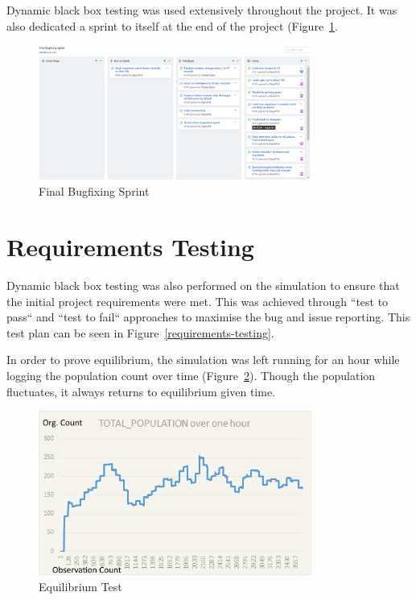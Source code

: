 \documentclass[a4paper, oneside, 11pt]{report}
\begin{document}
Dynamic black box testing was used extensively throughout the project. It was also dedicated a sprint to itself at the end of the project (Figure~\ref{gitbugfixing}.

\begin{figure}[H]
	\caption{Final Bugfixing Sprint}\label{gitbugfixing}
	\centering
	\includegraphics[width=0.8\textwidth]{gitbugfixing}
\end{figure}

\section{Requirements Testing}
Dynamic black box testing was also performed on the simulation to ensure that the initial project requirements were met. This was achieved through ``test to pass`` and ``test to fail`` approaches to maximise the bug and issue reporting. This test plan can be seen in Figure~\ref{requirements-testing}.

In order to prove equilibrium, the simulation was left running for an hour while logging the population count over time (Figure~\ref{equilibrium-test}). Though the population fluctuates, it always returns to equilibrium given time.
	
\begin{figure}[H]
	\caption{Equilibrium Test}\label{equilibrium-test}
	\centering
	\includegraphics[width=0.8\textwidth]{equilibrium-test}
\end{figure}
	
\end{document}
